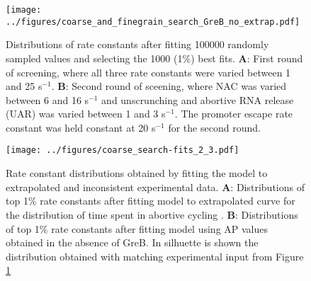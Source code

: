 \begin{figure}
	\begin{center}
      \texttt{[image: ../figures/coarse\_and\_finegrain\_search\_GreB\_no\_extrap.pdf]}
	\end{center}
    \caption{Distributions of rate constants after fitting 100000 randomly
      sampled values and selecting the 1000 (1\%) best fits. \textbf{A}: First round
      of screening, where all three rate constants were varied between 1 and
      25 s$^{-1}$. \textbf{B}: Second round of sceening, where NAC was varied
      between 6 and 16 s$^{-1}$ and unscrunching and abortive RNA release
      (UAR) was varied between 1 and 3 s$^{-1}$. The promoter escape rate
      constant was held constant at 20 s$^{-1}$ for the second round.}
      \label{fig:parameter_estimation_proper}
\end{figure}

\begin{figure}
	\begin{center}
      \texttt{[image: ../figures/coarse\_search-fits\_2\_3.pdf]}
	\end{center}
    \caption{
      Rate constant distributions obtained by fitting the model to
      extrapolated and inconsistent experimental data. \textbf{A}:
      Distributions of top 1\% rate constants after fitting model to
      extrapolated curve for the distribution of time spent in abortive
      cycling \cite{revyakin_abortive_2006}. \textbf{B}: Distributions of top
      1\% rate constants after fitting model using AP values obtained in the
      absence of GreB. In silhuette is shown the distribution obtained with
      matching experimental input from Figure \ref{fig:parameter_estimation_proper}}

      \label{fig:extrap_and_GreB_minus_fit}
\end{figure}

